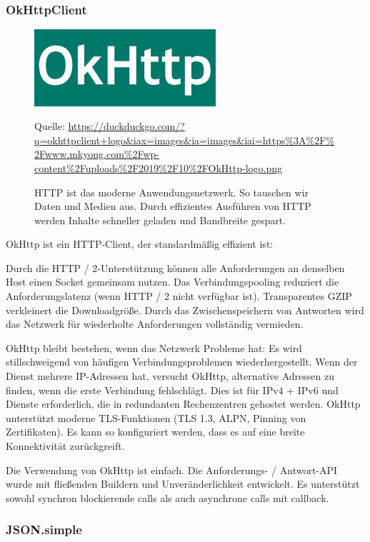 \documentclass[10pt]{scrartcl}
\newcommand*{\quelle}{%
	\footnotesize Quelle:
}
\begin{document}
\subsubsection{OkHttpClient}

\begin{figure}[H]
	\centering
	\includegraphics[width=0.6\textwidth]{Bilder/BibliothekenLogos/OKHTTP.jpg}
	\caption{HTTP ist das moderne Anwendungsnetzwerk. So tauschen wir Daten und Medien aus. Durch effizientes Ausführen von HTTP werden Inhalte schneller geladen und Bandbreite gespart.}
	\quelle\url{https://duckduckgo.com/?q=okhttpclient+logo&iax=images&ia=images&iai=https%3A%2F%2Fwww.mkyong.com%2Fwp-content%2Fuploads%2F2019%2F10%2FOkHttp-logo.png}
\end{figure}

OkHttp ist ein HTTP-Client, der standardmäßig effizient ist:

Durch die HTTP / 2-Unterstützung können alle Anforderungen an denselben Host einen Socket gemeinsam nutzen.
Das Verbindungspooling reduziert die Anforderungslatenz (wenn HTTP / 2 nicht verfügbar ist).
Transparentes GZIP verkleinert die Downloadgröße.
Durch das Zwischenspeichern von Antworten wird das Netzwerk für wiederholte Anforderungen vollständig vermieden.

OkHttp bleibt bestehen, wenn das Netzwerk Probleme hat: Es wird stillschweigend von häufigen Verbindungsproblemen wiederhergestellt. Wenn der Dienst mehrere IP-Adressen hat, versucht OkHttp, alternative Adressen zu finden, wenn die erste Verbindung fehlschlägt. Dies ist für IPv4 + IPv6 und Dienste erforderlich, die in redundanten Rechenzentren gehostet werden. OkHttp unterstützt moderne TLS-Funktionen (TLS 1.3, ALPN, Pinning von Zertifikaten). Es kann so konfiguriert werden, dass es auf eine breite Konnektivität zurückgreift.

Die Verwendung von OkHttp ist einfach. Die Anforderungs- / Antwort-API wurde mit fließenden Buildern und Unveränderlichkeit entwickelt. Es unterstützt sowohl synchron blockierende calls als auch asynchrone calls mit callback.

\subsubsection{JSON.simple}
	
\end{document}
